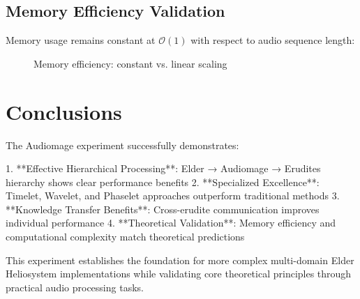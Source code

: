 \subsection{Memory Efficiency Validation}

Memory usage remains constant at $\mathcal{O}(1)$ with respect to audio sequence length:

\begin{figure}[h]
\centering
{}
\caption{Memory efficiency: constant vs. linear scaling}
\end{figure}

\section{Conclusions}

The Audiomage experiment successfully demonstrates:

1. **Effective Hierarchical Processing**: Elder → Audiomage → Erudites hierarchy shows clear performance benefits
2. **Specialized Excellence**: Timelet, Wavelet, and Phaselet approaches outperform traditional methods
3. **Knowledge Transfer Benefits**: Cross-erudite communication improves individual performance
4. **Theoretical Validation**: Memory efficiency and computational complexity match theoretical predictions

This experiment establishes the foundation for more complex multi-domain Elder Heliosystem implementations while validating core theoretical principles through practical audio processing tasks.